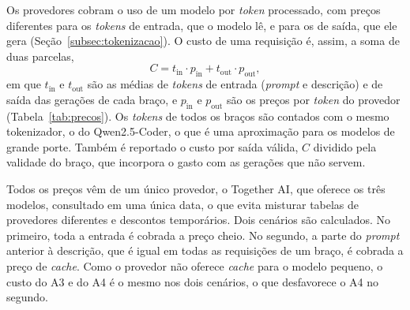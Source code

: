 Os provedores cobram o uso de um modelo por \textit{token} processado, com preços diferentes para os \textit{tokens} de entrada, que o modelo lê, e para os de saída, que ele gera (Seção~\ref{subsec:tokenizacao}). O custo de uma requisição é, assim, a soma de duas parcelas,
\begin{equation}
	C = t_{\text{in}} \cdot p_{\text{in}} + t_{\text{out}} \cdot p_{\text{out}},
\end{equation}
em que $t_{\text{in}}$ e $t_{\text{out}}$ são as médias de \textit{tokens} de entrada (\textit{prompt} e descrição) e de saída das gerações de cada braço, e $p_{\text{in}}$ e $p_{\text{out}}$ são os preços por \textit{token} do provedor (Tabela~\ref{tab:precos}). Os \textit{tokens} de todos os braços são contados com o mesmo tokenizador, o do Qwen2.5-Coder, o que é uma aproximação para os modelos de grande porte. Também é reportado o custo por saída válida, $C$ dividido pela validade do braço, que incorpora o gasto com as gerações que não servem.

\begin{table}[htb]
\end{table}

Todos os preços vêm de um único provedor, o Together AI, que oferece os três modelos, consultado em uma única data, o que evita misturar tabelas de provedores diferentes e descontos temporários. Dois cenários são calculados. No primeiro, toda a entrada é cobrada a preço cheio. No segundo, a parte do \textit{prompt} anterior à descrição, que é igual em todas as requisições de um braço, é cobrada a preço de \textit{cache}. Como o provedor não oferece \textit{cache} para o modelo pequeno, o custo do A3 e do A4 é o mesmo nos dois cenários, o que desfavorece o A4 no segundo.

